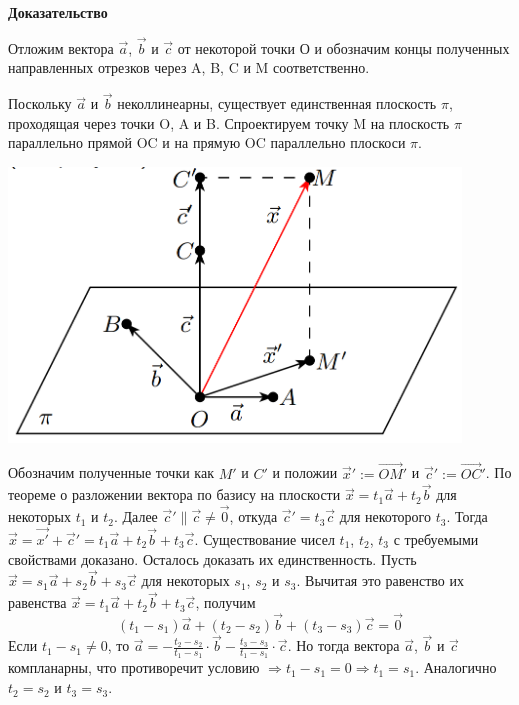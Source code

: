 \documentclass[a4paper]{article}
\begin{document}
    \begin{hproof}
        \textbf{Доказательство}

        Отложим вектора $\vec{a}$, $\vec{b}$  и $\vec{c}$ от некоторой точки О и обозначим концы полученных направленных отрезков через A, B, C и M соответственно.

        Поскольку $\vec{a}$ и $\vec{b}$ неколлинеарны, существует единственная плоскость $\pi$, проходящая через точки O, A и B. Спроектируем точку M на плоскость $\pi$ параллельно прямой OC и на прямую OC параллельно плоскоси $\pi$.

        \includegraphics[width=12cm]{t3}

        Обозначим полученные точки как $M'$ и $C'$ и положии $\vec{x}' := \overrightarrow{OM}'$ и $\vec{c}' := \overrightarrow{OC}'$. По теореме о разложении вектора по базису на плоскости  $\vec{x} = t_1 \vec{a} + t_2 \vec{b}$ для некоторых $t_1$ и $t_2$. Далее $\vec{c}' \parallel \vec{c} \neq \vec{0}$, откуда $\vec{c}' = t_3 \vec{c}$ для некоторого $t_3$. Тогда $\vec{x} = \vec{x'} + \vec{c}' = t_1 \vec{a} + t_2 \vec{b} + t_3 \vec{c}$. Существование чисел $t_1$, $t_2$, $t_3$ с требуемыми свойствами доказано.
        Осталось доказать их единственность. Пусть $\vec{x} = s_1 \vec{a} + s_2 \vec{b} + s_3 \vec{c}$ для некоторых $s_1$, $s_2$ и $s_3$. Вычитая это равенство их равенства $\vec{x} = t_1 \vec{a} + t_2 \vec{b} + t_3 \vec{c}$, получим
        \begin{equation}
        (t_1 -s_1)
            \vec{a} + (t_2 - s_2)\vec{b} + (t_3 - s_3) \vec{c} = \vec{0}
        \end{equation}
        Если $\displaystyle t_1 -s_1 \neq    0$, то $\vec{a} = - \frac{t_2 - s_2}{t_1 - s_1} \cdot \vec{b} - \frac{t_3 - s_3}{t_1 - s_1} \cdot \vec{c}$. Но тогда вектора $\vec{a}$, $\vec{b}$ и $\vec{c}$ компланарны, что противоречит условию $\Rightarrow t_1 - s_1 = 0 \Rightarrow t_1 = s_1$. Аналогично $t_2 = s_2$ и $t_3 = s_3$.
    \end{hproof}
\end{document}
